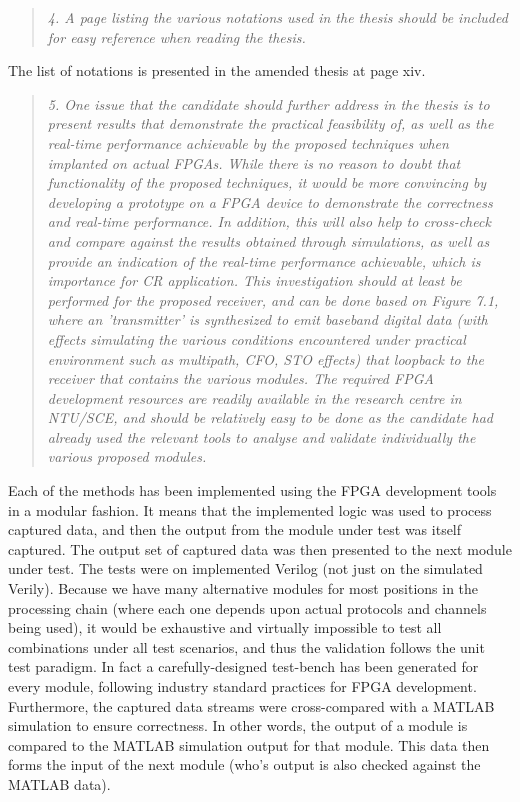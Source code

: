 \documentclass{article}
\begin{document}
\begin{quote}
\emph{4. A page listing the various notations used in the thesis should be included for easy reference when reading the thesis.}
\end{quote}
The list of notations is presented in the amended thesis at page xiv.

\begin{quote}
\emph{5. One issue that the candidate should further address in the thesis is to present results that demonstrate the practical feasibility of, as well as the real-time performance achievable by the proposed techniques when implanted on actual FPGAs. While there is no reason to doubt that functionality of the proposed techniques, it would be more convincing by developing a prototype on a FPGA device to demonstrate the correctness and real-time performance. In addition, this will also help to cross-check and compare against the results obtained through simulations, as well as provide an indication of the real-time performance achievable, which is importance for CR application. This investigation should at least be performed for the proposed receiver, and can be done based on Figure 7.1, where an 'transmitter' is synthesized to emit baseband digital data (with effects simulating the various conditions encountered under practical environment such as multipath, CFO, STO effects) that loopback to the receiver that contains the various modules. The required FPGA development resources are readily available in the research centre in NTU/SCE, and should be relatively easy to be done as the candidate had already used the relevant tools to analyse and validate individually the various proposed modules.}
\end{quote}

Each of the methods has been implemented using the FPGA development tools in a modular fashion. It means that the implemented logic was used to process captured data, and then the output from the module under test was itself captured. The output set of captured data was then presented to the next module under test. The tests were on implemented Verilog (not just on the simulated Verily). Because we have many alternative modules for most positions in the processing chain (where each one depends upon actual protocols and channels being used), it would be exhaustive and virtually impossible to test all combinations under all test scenarios, and thus the validation follows the unit test paradigm.
In fact a carefully-designed test-bench has been generated for every module, following industry standard practices for FPGA development.
Furthermore, the captured data streams were cross-compared with a MATLAB simulation to ensure correctness. In other words, the output of a module is compared to the MATLAB simulation output for that module. This data then forms the input of the next module (who's output is also checked against the MATLAB data).
\end{document}
